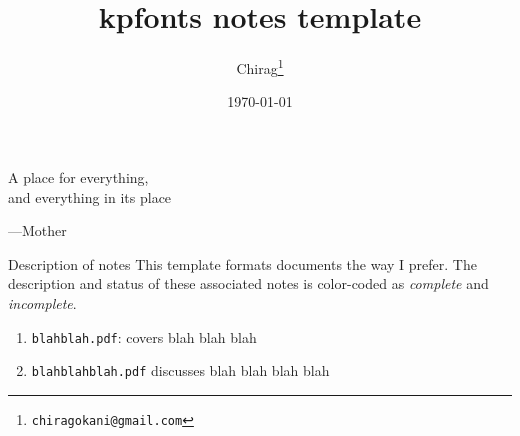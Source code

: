 \documentclass[12pt]{article}
\title{\textsf{kpfonts} notes template}
\author{Chirag\footnote{\texttt{chiragokani@gmail.com}}}
\date{\today}
\numberwithin{equation}{subsection}
\begin{document}
\maketitle
\setlength{\epigraphwidth}{0.31\textwidth}
\epigraph{A place for everything,\\and everything in its place}{---Mother}

\begin{graytext}{Description of notes}
This template formats documents the way I prefer. The description and status of these associated notes is color-coded as \color{cyan}\textit{complete} \color{black} and  \color{magenta}\textit{incomplete}\color{black}.
\begin{enumerate}[label=(\alph*)]
\item \color{cyan}\texttt{blahblah.pdf}: covers blah blah blah \color{black} 
\item \color{magenta}\texttt{blahblahblah.pdf} discusses blah blah blah blah \color{black} 
\end{enumerate}
\end{graytext}
\tableofcontents
\end{document}
